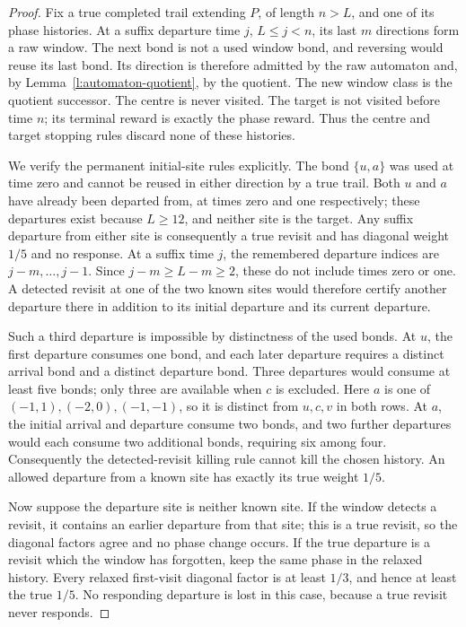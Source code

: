 \begin{proof}
Fix a true completed trail extending \(P\), of length \(n>L\),
and one of its phase histories. At a suffix departure time
\(j\), \(L\le j<n\), its last \(m\) directions form a raw
window. The next bond is not a used window bond, and reversing
would reuse its last bond. Its direction is therefore admitted by
the raw automaton and, by Lemma~\ref{l:automaton-quotient}, by the
quotient. The new window class is the quotient successor.
The centre is never visited. The target is not visited before time
\(n\); its terminal reward is exactly the phase reward. Thus the
centre and target stopping rules discard none of these histories.

We verify the permanent initial-site rules explicitly. The bond
\(\{u,a\}\) was used at time zero and cannot be reused in either
direction by a true trail. Both \(u\) and \(a\) have already
been departed from, at times zero and one respectively; these
departures exist because \(L\ge12\), and neither site is the
target. Any suffix departure from either site is consequently a
true revisit and has diagonal weight \(1/5\) and no response.
At a suffix time \(j\), the remembered departure indices are
\(j-m,\ldots,j-1\). Since \(j-m\ge L-m\ge2\), these do not
include times zero or one. A detected revisit at one of the two
known sites would therefore certify another departure there in
addition to its initial departure and its current departure.

Such a third departure is impossible by distinctness of the used
bonds. At \(u\), the first departure consumes one bond, and each
later departure requires a distinct arrival bond and a distinct
departure bond. Three departures would consume at least five
bonds; only three are available when \(c\) is excluded.
Here \(a\) is one of \((-1,1),(-2,0),(-1,-1)\), so it is distinct
from \(u,c,v\) in both rows. At \(a\), the initial arrival and
departure consume two
bonds, and two further departures would each consume two additional
bonds, requiring six among four. Consequently the detected-revisit
killing rule cannot kill the chosen history. An allowed departure
from a known site has exactly its true weight \(1/5\).

Now suppose the departure site is neither known site. If the
window detects a revisit, it contains an earlier departure from
that site; this is a true revisit, so the diagonal factors agree
and no phase change occurs. If the true departure is a revisit
which the window has forgotten, keep the same phase in the relaxed
history. Every relaxed first-visit diagonal factor is at least
\(1/3\), and hence at least the true \(1/5\). No responding
departure is lost in this case, because a true revisit never responds.


\end{proof}
